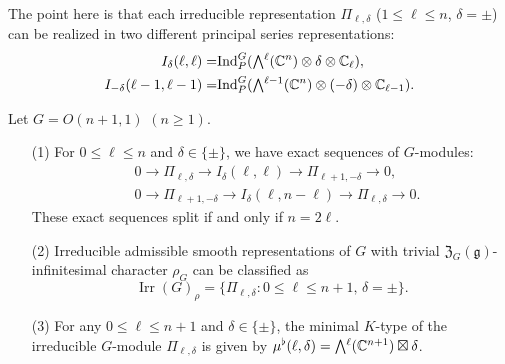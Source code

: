 \begin{remark}
\label{rem:flatsharp}
The point here is 
 that each irreducible representation
 $\Pi_{\ell,\delta}$ ($1 \le \ell \le n$, $\delta=\pm$)
 can be realized in two different principal series representations:
\begin{align*}
   I_{\delta}(\ell,\ell) =& {\operatorname{Ind}}_P^G (\Exterior^\ell({\mathbb{C}}^n) \otimes \delta \otimes {\mathbb{C}}_\ell), 
\\
I_{-\delta}(\ell-1,\ell-1) 
=& {\operatorname{Ind}}_P^G (\Exterior^{\ell-1}({\mathbb{C}}^n) \otimes (-\delta) \otimes {\mathbb{C}}_{\ell-1}).  
\end{align*}
\end{remark}

\begin{theorem}
\label{thm:LNM20}
Let $G=O(n+1,1)$ $(n \ge 1)$.  
\begin{enumerate}
\item[{\rm{(1)}}]
For $0 \le \ell \le n$ and $\delta \in \{ \pm \}$, 
 we have exact sequences of $G$-modules:
\begin{align*}
&0 \to \Pi_{\ell,\delta} \to I_{\delta}(\ell,\ell) \to \Pi_{\ell+1,-\delta}
\to 0, 
\\
&0 \to \Pi_{\ell+1,-\delta} \to I_{\delta}(\ell,n-\ell) \to \Pi_{\ell,\delta} \to 0.  
\end{align*}
These exact sequences split
 if and only if $n=2\ell$.  

\item[{\rm{(2)}}]
Irreducible admissible smooth representations of $G$ 
 with trivial
 ${\mathfrak {Z}}_G({\mathfrak {g}})$-infinitesimal character
 $\rho_G$
 can be classified as
\[
  {\operatorname{Irr}}(G)_{\rho}
  =\{
    \Pi_{\ell, \delta}
    :
    0 \le \ell \le n+1, \, \delta = \pm
\}.  
\]

\item[{\rm{(3)}}]
For any $0 \le \ell \le n+1$
 and $\delta \in \{\pm\}$, 
 the 
minimal $K$-type of the irreducible $G$-module $\Pi_{\ell,\delta}$
 is given 
by $\mub(\ell,\delta)=\Exterior^\ell({\mathbb{C}}^{n+1}) \boxtimes \delta$.  


\end{enumerate}
\end{theorem}
